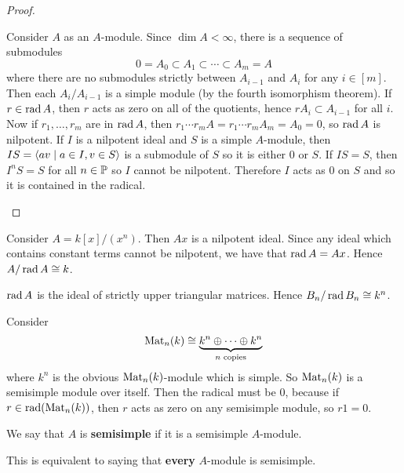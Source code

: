 \begin{proof}
	\begin{enum}
		\io
        Consider $A$ as an $A$-module.
        Since $\dim A < \infty$, there is a sequence of submodules
        \[0 = A_0 \subset A_1 \subset \cdots \subset A_m = A\]
        where there are no submodules strictly between $A_{i-1}$ and $A_i$ for any $i \in [m]$.
        Then each $A_i/A_{i-1}$ is a simple module (by the fourth isomorphism theorem).
        If $r \in \operatorname{rad} A$, then $r$ acts as zero on all of the quotients, hence $rA_i \subset A_{i-1}$ for all $i$.
        Now if $r_1,\ldots,r_m$ are in $\operatorname{rad} A$, then $r_1 \cdots r_m A = r_1 \cdots r_m A_m = A_0 = 0$, so $\operatorname{rad} A$ is nilpotent.
        \io
        If $I$ is a nilpotent ideal and $S$ is a simple $A$-module, then $IS = {\left\langle av \mid a \in I, v \in S \right\rangle}$ is a submodule of $S$ so it is either $0$ or $S$.
        If $IS=S$, then $I^nS=S$ for all $n \in \mathbb{P}$ so $I$ cannot be nilpotent.
        Therefore $I$ acts as 0 on $S$ and so it is contained in the radical.
        \qedhere
	\end{enum}
\end{proof}

\begin{exam}
	\begin{enum}
    	\io
		Consider $A = k[x]/(x^n)$.
    	Then $Ax$ is a nilpotent ideal.
    	Since any ideal which contains constant terms cannot be nilpotent, we have that $\operatorname{rad} A = Ax$.
        Hence $A/\operatorname{rad} A \cong k$.
        
        \io
        $\operatorname{rad} A$ is the ideal of strictly upper triangular matrices.
        Hence $B_n/\operatorname{rad} B_n \cong k^n$.
        
        \io
        Consider
        \[\operatorname{Mat}_n(k) \cong \underbrace{k^n \oplus \cdots \oplus k^n}_{n\text{ copies}}\]
        where $k^n$ is the obvious $\operatorname{Mat}_n(k)$-module which is simple.
        So $\operatorname{Mat}_n(k)$ is a semisimple module over itself.
        Then the radical must be 0, because if $r \in \operatorname{rad}(\operatorname{Mat}_n(k))$, then $r$ acts as zero on any semisimple module, so $r1=0$.
	\end{enum}
\end{exam}

\begin{defn}
	We say that $A$ is \textbf{semisimple} if it is a semisimple $A$-module.
\end{defn}

\begin{prop}
	This is equivalent to saying that \textbf{every} $A$-module is semisimple.
\end{prop}

